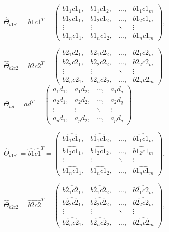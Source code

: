 \documentclass[12pt,a4paper]{report}
\begin{document}
$\hat{\Theta}_{b1c1}=b1c1^T=\begin{pmatrix}
b1_1c1_1, & b1_1c1_2, & ..., & b1_1c1_m\\ 
b1_2c1_1, & b1_2c1_2, & ..., & b1_2c1_m\\ 
 \vdots &  \vdots & \ddots   &\vdots  \\ 
b1_nc1_1, & b1_nc1_2, & ..., & b1_nc1_m
\end{pmatrix},\,$

$\hat{\Theta}_{b2c2}=b2c2^T=\begin{pmatrix}
b2_1c2_1, & b2_1c2_2, & ..., & b2_1c2_m\\ 
b2_2c2_1, & b2_2c2_2, & ..., & b2_2c2_m\\ 
 \vdots &  \vdots & \ddots   &\vdots  \\ 
b2_nc2_1, & b2_nc2_2, & ..., & b2_nc2_m
\end{pmatrix} $\\

$\Theta_{ad}=ad^T=\begin{pmatrix}
a_1d_1, & a_1d_2, & \cdots , & a_1d_q\\ 
a_2d_1, & a_2d_2, & \cdots, & a_2d_q\\ 
 \vdots &  \vdots & \ddots   &\vdots  \\ 
a_pd_1, & a_pd_2, & \cdots, & a_pd_q
\end{pmatrix}$

$\hat{\Theta}_{b1c1}=\hat{b1}\hat{c1}^T=\begin{pmatrix}
\widehat{b1_1c1_1}, & \widehat{b1_1c1_2}, & ..., & \widehat{b1_1c1_m}\\ 
\widehat{b1_2c1_1}, & \widehat{b1_2c1_2}, & ..., & \widehat{b1_2c1_m}\\ 
 \vdots &  \vdots & \ddots   &\vdots  \\ 
\widehat{b1_nc1_1}, & \widehat{b1_nc1_2}, & ..., & \widehat{b1_nc1_m}
\end{pmatrix},$\,

$\hat{\Theta}_{b2c2}=\hat{b2}\hat{c2}^T=\begin{pmatrix}
\widehat{b2_1c2_1}, & \widehat{b2_1c2_2}, & ..., & \widehat{b2_1c2_m}\\ 
\widehat{b2_2c2_1}, & \widehat{b2_2c2_2}, & ..., & \widehat{b2_2c2_m}\\ 
 \vdots &  \vdots & \ddots   &\vdots  \\ 
\widehat{b2_nc2_1}, & \widehat{b2_nc2_2}, & ..., & \widehat{b2_nc2_m}
\end{pmatrix}$,\\
\end{document}
